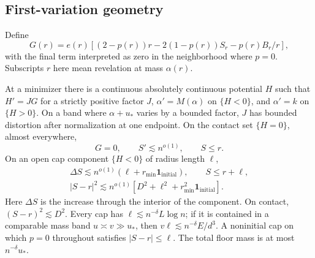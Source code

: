 \subsection{First-variation geometry}

Define
\[
 G(r)=e(r)\left[(2-p(r))r-2(1-p(r))S_r-p(r)B_r/r\right],
\]
with the final term interpreted as zero in the neighborhood where $p=0$.
Subscripts $r$ here mean revelation at mass $\alpha(r)$.

\begin{lemma}\label{comp:geometry}
At a minimizer there is a continuous absolutely continuous potential
$H$ such that $H'=JG$ for a strictly positive factor $J$,
$\alpha'=M(\alpha)$ on $\{H<0\}$, and $\alpha'=k$ on $\{H>0\}$.
On a band where $\alpha+u_*$ varies by a bounded factor, $J$ has bounded
distortion after normalization at one endpoint.  On the contact set
$\{H=0\}$, almost everywhere,
\begin{equation}
 G=0,\qquad S'\lesssim n^{o(1)},\qquad S\le r.
 \tag{9}\label{eq:9}
\end{equation}
On an open cap component $\{H<0\}$ of radius length $\ell$,
\begin{equation}
 \begin{gathered}
 \Delta S\lesssim n^{o(1)}
        (\ell+r_{\min}\mathbf1_{\mathrm{initial}}),
 \qquad S\le r+\ell,\\
 |S-r|^2\lesssim n^{o(1)}
   \left[D^2+\ell^2+r_{\min}^2\mathbf1_{\mathrm{initial}}\right].
 \end{gathered}
 \tag{10}\label{eq:10}
\end{equation}
Here $\Delta S$ is the increase through the interior of the component.
On contact, $(S-r)^2\lesssim D^2$.  Every cap has
$\ell\lesssim n^{-\delta}L\log n$; if it is contained in a comparable
mass band $u\asymp v\gg u_*$, then
$v\ell\lesssim n^{-\delta}E/d^3$.  A noninitial cap on which $p=0$
throughout satisfies $|S-r|\le\ell$.  The total floor mass is at most
$n^{-\delta}u_*$.
\end{lemma}


